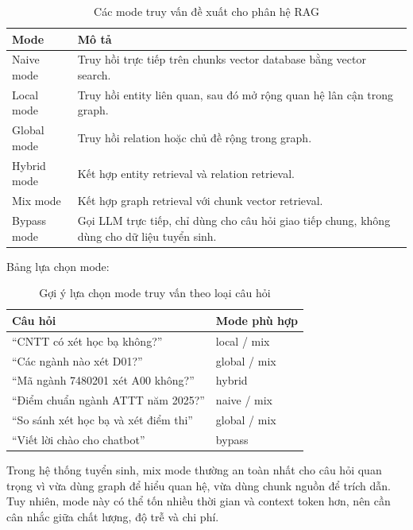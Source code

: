 \begin{table}[H]
\centering
\begin{tabular}{|p{3.2cm}|p{9.6cm}|}
\hline
\textbf{Mode} & \textbf{Mô tả} \\
\hline
Naive mode & Truy hồi trực tiếp trên chunks vector database bằng vector search. \\
\hline
Local mode & Truy hồi entity liên quan, sau đó mở rộng quan hệ lân cận trong graph. \\
\hline
Global mode & Truy hồi relation hoặc chủ đề rộng trong graph. \\
\hline
Hybrid mode & Kết hợp entity retrieval và relation retrieval. \\
\hline
Mix mode & Kết hợp graph retrieval với chunk vector retrieval. \\
\hline
Bypass mode & Gọi LLM trực tiếp, chỉ dùng cho câu hỏi giao tiếp chung, không dùng cho dữ liệu tuyển sinh. \\
\hline
\end{tabular}
\caption{Các mode truy vấn đề xuất cho phân hệ RAG}
\label{tab:rag-query-modes}
\end{table}

Bảng lựa chọn mode:

\begin{table}[H]
\centering
\begin{tabular}{|p{6cm}|p{6.8cm}|}
\hline
\textbf{Câu hỏi} & \textbf{Mode phù hợp} \\
\hline
``CNTT có xét học bạ không?'' & local / mix \\
\hline
``Các ngành nào xét D01?'' & global / mix \\
\hline
``Mã ngành 7480201 xét A00 không?'' & hybrid \\
\hline
``Điểm chuẩn ngành ATTT năm 2025?'' & naive / mix \\
\hline
``So sánh xét học bạ và xét điểm thi'' & global / mix \\
\hline
``Viết lời chào cho chatbot'' & bypass \\
\hline
\end{tabular}
\caption{Gợi ý lựa chọn mode truy vấn theo loại câu hỏi}
\label{tab:rag-mode-selection}
\end{table}

Trong hệ thống tuyển sinh, mix mode thường an toàn nhất cho câu hỏi quan trọng vì vừa dùng graph để hiểu quan hệ, vừa dùng chunk nguồn để trích dẫn. Tuy nhiên, mode này có thể tốn nhiều thời gian và context token hơn, nên cần cân nhắc giữa chất lượng, độ trễ và chi phí.

